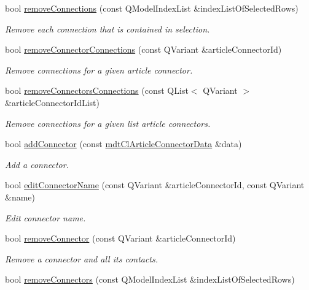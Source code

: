 \begin{DoxyCompactItemize}
bool \hyperlink{classmdt_cl_article_af81c77766eafe0cbd88c7f00f4ec4928}{remove\-Connections} (const Q\-Model\-Index\-List \&index\-List\-Of\-Selected\-Rows)
\begin{DoxyCompactList}\small\item\em Remove each connection that is contained in selection. \end{DoxyCompactList}\item 
bool \hyperlink{classmdt_cl_article_ac9704a413087d1d0e8f2dd51c33bd74e}{remove\-Connector\-Connections} (const Q\-Variant \&article\-Connector\-Id)
\begin{DoxyCompactList}\small\item\em Remove connections for a given article connector. \end{DoxyCompactList}\item 
bool \hyperlink{classmdt_cl_article_af9e67178a6028549a1b8167efafe6544}{remove\-Connectors\-Connections} (const Q\-List$<$ Q\-Variant $>$ \&article\-Connector\-Id\-List)
\begin{DoxyCompactList}\small\item\em Remove connections for a given list article connectors. \end{DoxyCompactList}\item 
bool \hyperlink{classmdt_cl_article_a2e30c08621a8cc73bc4f6c041189f9ab}{add\-Connector} (const \hyperlink{classmdt_cl_article_connector_data}{mdt\-Cl\-Article\-Connector\-Data} \&data)
\begin{DoxyCompactList}\small\item\em Add a connector. \end{DoxyCompactList}\item 
bool \hyperlink{classmdt_cl_article_aed8a2fc638636a618409694a655e9819}{edit\-Connector\-Name} (const Q\-Variant \&article\-Connector\-Id, const Q\-Variant \&name)
\begin{DoxyCompactList}\small\item\em Edit connector name. \end{DoxyCompactList}\item 
bool \hyperlink{classmdt_cl_article_aa675a24b08929b5efb4c421176b8bdde}{remove\-Connector} (const Q\-Variant \&article\-Connector\-Id)
\begin{DoxyCompactList}\small\item\em Remove a connector and all its contacts. \end{DoxyCompactList}\item 
bool \hyperlink{classmdt_cl_article_a76b8a9d9c0faf7081632fa94e25d58d3}{remove\-Connectors} (const Q\-Model\-Index\-List \&index\-List\-Of\-Selected\-Rows)

\end{DoxyCompactItemize}
